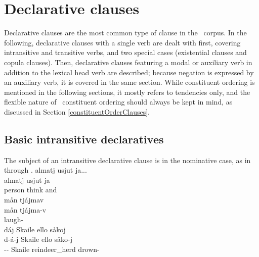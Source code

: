 \section{Declarative clauses}\label{declClauses}
Declarative clauses are the most common type of clause in the \PS\ corpus. In the following, declarative clauses with a single verb are dealt with first, covering intransitive and transitive verbs, and two special cases (existential clauses and copula clauses). Then, declarative clauses featuring a modal or auxiliary verb in addition to the lexical head verb are described; because negation is expressed by an auxiliary verb, it is covered in the same section. While constituent ordering is mentioned in the following sections, it mostly refers to tendencies only, and the flexible nature of \PS\ constituent ordering should always be kept in mind, as discussed in Section \ref{constituentOrderClauses}. 

\subsection{Basic intransitive declaratives}\label{basicIntransDeclaratives}
The subject of an intransitive declarative clause is in the nominative case, %
as in  through . 
\ea\label{basicIntransDeclaratives1}
\glll	almatj usjut ja...\\
	almatj usjut ja\\
	person\BS{} think\BS{} and \\%
 
\z
\ea\label{basicIntransDeclaratives2}
\glll	mån tjájmav\\
	mån tjájma-v\\
	 laugh- \\\nopagebreak
{} 
\z
\ea\label{basicIntransDeclaratives3}
\glll	dáj Skaile ello såkoj\\
	d-á-j Skaile ello såko-j\\
	-- Skaile\BS{} reindeer\_herd\BS{} drown- \\\nopagebreak
{} 
\z



